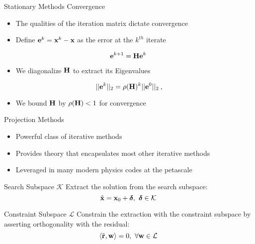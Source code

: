 \documentclass{beamer}
\begin{document}
\begin{frame}{Stationary Methods Convergence}

  \begin{itemize}
  \item The qualities of the iteration matrix dictate convergence 
  \item Define $\mathbf{e}^k = \mathbf{x}^k-\mathbf{x}$ as the error at the
    $k^{th}$ iterate
  \end{itemize}

  \[
  \mathbf{e}^{k+1} = \mathbf{H} \mathbf{e}^k\:
  \]


  \begin{itemize}
  \item We diagonalize $\mathbf{H}$ to extract its Eigenvalues
  \end{itemize}

  \[
  ||\mathbf{e}^{k}||_2 = \rho(\mathbf{H})^k ||\mathbf{e}^0||_2\:,
  \]

  \begin{itemize}
  \item We bound $\mathbf{H}$ by $\rho(\mathbf{H}) < 1$ for convergence
  \end{itemize}

\end{frame}

\begin{frame}{Projection Methods}

  \begin{itemize}
    \item Powerful class of iterative methods
    \item Provides theory that encapsulates most other iterative
      methods 
    \item Leveraged in many modern physics codes at the petascale
  \end{itemize}

  \pause
  \begin{beamerboxesrounded}[upper=boxheadcolor,lower=boxbodycolor,shadow=true]
    {Search Subspace $\mathcal{K}$} 
    Extract the solution from the search subspace:
    \[
    \tilde{\mathbf{x}} = \mathbf{x}_0 +
    \boldsymbol{\delta},\ \boldsymbol{\delta} \in \mathcal{K}\:
    \]
  \end{beamerboxesrounded}

  \pause
  \begin{beamerboxesrounded}[upper=boxheadcolor,lower=boxbodycolor,shadow=true]
    {Constraint Subspace $\mathcal{L}$} 
    Constrain the extraction with the constraint subspace by asserting
    orthogonality with the residual:
    \[
    \langle \tilde{\mathbf{r}},\mathbf{w} \rangle = 0,\ \forall \mathbf{w} \in
    \mathcal{L}\:
    \]  
  \end{beamerboxesrounded}

\end{frame}
\end{document}

